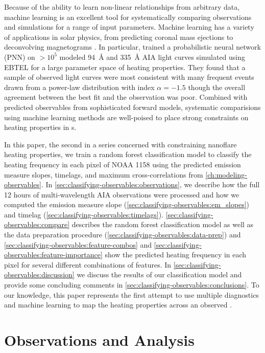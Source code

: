 Because of the ability to learn non-linear relationships from arbitrary data, machine learning  is an excellent tool for systematically comparing observations and simulations for a range of input parameters. Machine learning has a variety of applications in solar physics, from predicting coronal mass ejections \citep[e.g.][]{bobra_predicting_2016} to deconvolving magnetograms \citep{baso_enhancing_2018}. In particular, \citet{tajfirouze_time-resolved_2016} trained a probabilistic neural network (PNN) on  $>10^5$ modeled \SI{94}{\angstrom} and \SI{335}{\angstrom} AIA light curves simulated using EBTEL for a large parameter space of heating properties. They found that a sample of observed light curves were most consistent with many frequent events drawn from a power-law distribution with index $\alpha=-1.5$ though the overall agreement between the best fit and the observation was poor. Combined with predicted observables from sophisticated forward models, systematic comparisions using machine learning methods are well-poised to place strong constraints on heating properties in \AR s.

In this paper, the second in a series concerned with constraining nanoflare heating properties, we train a random forest classification model to classify the heating frequency in each pixel of \AR{} NOAA 1158 using the predicted emission measure slopes, timelags, and maximum cross-correlations from \autoref{ch:modeling-observables}. In \autoref{sec:classifying-observables:observations}, we describe how the full 12 hours of multi-wavelength AIA observations were processed and how we computed the emission measure slope (\autoref{sec:classifying-observables:em_slopes}) and timelag (\autoref{sec:classifying-observables:timelags}). \autoref{sec:classifying-observables:compare} describes the random forest classification model as well as the data preparation procedure (\autoref{sec:classifying-observables:data-prep}) and \autoref{sec:classifying-observables:feature-combos} and \ref{sec:classifying-observables:feature-importance} show the predicted heating frequency in each pixel for several different combinations of features. In \autoref{sec:classifying-observables:discussion} we discuss the results of our classification model and provide some concluding comments in \autoref{sec:classifying-observables:conclusions}. To our knowledge, this paper represents the first attempt to use multiple diagnostics and machine learning to map the heating properties across an observed \AR{}.

\section{Observations and Analysis}\label{sec:classifying-observables:observations}

